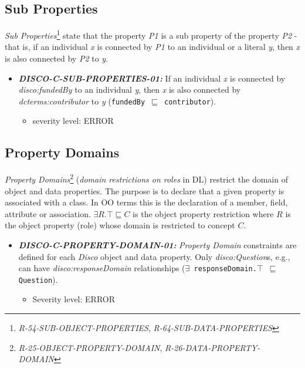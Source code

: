 \documentclass{llncs}
\newcommand{\ms}[1]{\texttt{#1}}
\begin{document}
\subsection{Sub Properties}

{\em Sub Properties}\footnote{\emph{R-54-SUB-OBJECT-PROPERTIES}, \emph{R-64-SUB-DATA-PROPERTIES}} state that the property \emph{P1} is a sub property of the property \emph{P2} - that is, if an individual \emph{x} is connected by \emph{P1} to an individual or a literal \emph{y}, then \emph{x} is also connected by \emph{P2} to \emph{y}. 

\begin{itemize}
	\item \textbf{{\em DISCO-C-SUB-PROPERTIES-01:}}
If an individual \emph{x} is connected by {\em disco:fundedBy} to an individual \emph{y}, then \emph{x} is also connected by {\em dcterms:contributor} to \emph{y} (\ms{fundedBy $\sqsubseteq$ contributor}). 
	\begin{itemize}
		\item severity level: ERROR
	\end{itemize}
\end{itemize}

\subsection{Property Domains}

{\em Property Domains}\footnote{{\em R-25-OBJECT-PROPERTY-DOMAIN}, {\em R-26-DATA-PROPERTY-DOMAIN}} ({\em domain restrictions on roles} in DL) restrict the domain of object and data properties.
The purpose is to declare that a given property is associated with a class. 
In OO terms this is the declaration of a member, field, attribute or association. 
$\exists R. \top \sqsubseteq C$ is the object property restriction where $R$ is the object property (role) whose domain is restricted to concept $C$.

\begin{itemize}
	\item \textbf{{\em DISCO-C-PROPERTY-DOMAIN-01:}} 
	{\em Property Domain} constraints are defined for each \emph{Disco} object and data property.
  Only {\em disco:Question}s, e.g., can have {\em disco:responseDomain} relationships (\ms{$\exists$ responseDomain.$\top$ $\sqsubseteq$ Question}).
	\begin{itemize}
		\item Severity level: ERROR
	\end{itemize}
\end{itemize}
\end{document}
